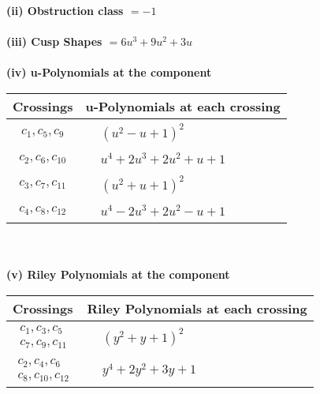 \documentclass[1p]{elsarticle_modified}
\theoremstyle{definition}
\begin{document}
\flushleft \textbf{(ii) Obstruction class $= -1$}\\~\\
\flushleft \textbf{(iii) Cusp Shapes $= 6 u^3+9 u^2+3 u$}\\~\\
\newpage\renewcommand{\arraystretch}{1}
\flushleft \textbf{(iv) u-Polynomials at the component}\newline \\
\begin{tabular}{m{50pt}|m{274pt}}
Crossings & \hspace{64pt}u-Polynomials at each crossing \\
\hline $$\begin{aligned}c_{1},c_{5},c_{9}\end{aligned}$$&$\begin{aligned}
&(u^2- u+1)^2
\end{aligned}$\\
\hline $$\begin{aligned}c_{2},c_{6},c_{10}\end{aligned}$$&$\begin{aligned}
&u^4+2 u^3+2 u^2+u+1
\end{aligned}$\\
\hline $$\begin{aligned}c_{3},c_{7},c_{11}\end{aligned}$$&$\begin{aligned}
&(u^2+u+1)^2
\end{aligned}$\\
\hline $$\begin{aligned}c_{4},c_{8},c_{12}\end{aligned}$$&$\begin{aligned}
&u^4-2 u^3+2 u^2- u+1
\end{aligned}$\\
\hline
\end{tabular}\\~\\
\newpage\renewcommand{\arraystretch}{1}
\flushleft \textbf{(v) Riley Polynomials at the component}\newline \\
\begin{tabular}{m{50pt}|m{274pt}}
Crossings & \hspace{64pt}Riley Polynomials at each crossing \\
\hline $$\begin{aligned}c_{1},c_{3},c_{5}\\c_{7},c_{9},c_{11}\end{aligned}$$&$\begin{aligned}
&(y^2+y+1)^2
\end{aligned}$\\
\hline $$\begin{aligned}c_{2},c_{4},c_{6}\\c_{8},c_{10},c_{12}\end{aligned}$$&$\begin{aligned}
&y^4+2 y^2+3 y+1
\end{aligned}$\\
\hline
\end{tabular}\\~\\
\end{document}
